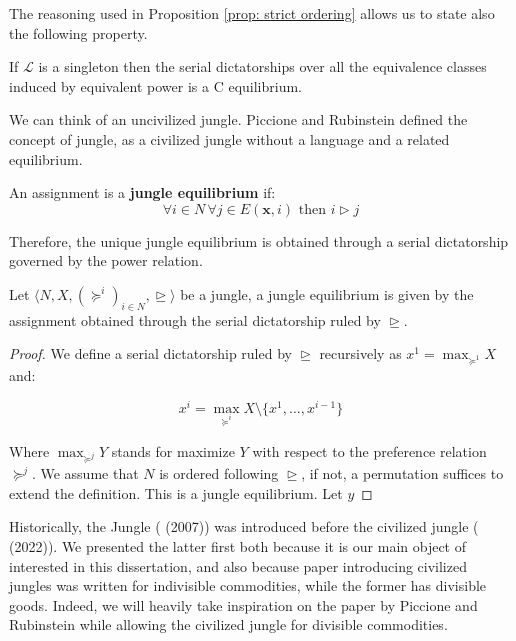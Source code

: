 The reasoning used in Proposition \ref{prop: strict ordering} allows us to state also the following property.

\begin{proposition}\label{prop: L singleton}
    If $\mathcal{L}$ is a singleton then the serial dictatorships over all the equivalence classes induced by equivalent power is a C equilibrium.  
\end{proposition}

We can think of an uncivilized jungle. Piccione and Rubinstein \cite[PR]{P-R} defined the concept of jungle, as a civilized jungle without a language and a related equilibrium.

\begin{definition}
    An assignment is a \textbf{jungle equilibrium} if: \[\forall i \in N \, \forall j \in E(\textbf{x},i) \text{ then } i\triangleright j\]
\end{definition}

Therefore, the unique jungle equilibrium is obtained through a serial dictatorship governed by the power relation. 

\begin{proposition}
    Let $\langle N,X,(\succeq^i)_{i\in N}, \trianglerighteq\rangle$ be a jungle, a jungle equilibrium is given by the assignment obtained through the serial dictatorship ruled by $\trianglerighteq$.

    \begin{proof}
        We define a serial dictatorship ruled by $\trianglerighteq$ recursively as $x^1=\max_{\succeq^1}X$ and:

        \[x^i=\max_{\succeq^i}X\setminus\{x^1,\dots,x^{i-1}\}\]

        Where $\max_{\succeq^j}Y$ stands for maximize $Y$ with respect to the preference relation $\succeq^j$. We assume that $N$ is ordered following $\trianglerighteq$, if not, a permutation suffices to extend the definition. This is a jungle equilibrium. Let $y$ 
    \end{proof}
\end{proposition}

Historically, the Jungle (\cite[PR]{P-R} (2007)) was introduced before the civilized jungle (\cite[RY]{RY} (2022)). We presented the latter first both because it is our main object of interested in this dissertation, and also because paper introducing civilized jungles was written for indivisible commodities, while the former has divisible goods. Indeed, we will heavily take inspiration on the paper by Piccione and Rubinstein while allowing the civilized jungle for divisible commodities. 

